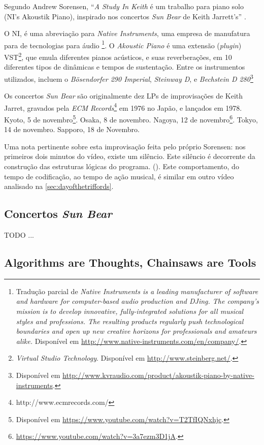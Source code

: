 Segundo Andrew Sorensen, ``\emph{A Study In Keith} é um trabalho para piano solo (NI's Akoustik Piano), inspirado nos concertos \emph{Sun Bear} de Keith Jarrett's'' \cite{sorensen_keith_2009}.

O NI, é uma abreviação para \emph{Native Instruments}, uma empresa de manufatura para  de tecnologias para áudio \footnote{Tradução parcial  de \emph{Native Instruments is a leading manufacturer of software and hardware for computer-based audio production and DJing. The company's mission is to develop innovative, fully-integrated solutions for all musical styles and professions. The resulting products regularly push technological boundaries and open up new creative horizons for professionals and amateurs alike.} Disponível em \url{http://www.native-instruments.com/en/company/}.}. O \emph{Akoustic Piano} é uma extensão (\emph{plugin}) VST\footnote{\emph{Virtual Studio Technology}. Disponível em \url{http://www.steinberg.net/}.}, que emula diferentes pianos acústicos, e suas reverberações, em 10 diferentes tipos de dinâmicas e tempos de sustentação. Entre os instrumentos utilizados, incluem o \emph{Bösendorfer 290 Imperial}, \emph{Steinway D}, e \emph{Bechstein D 280}\footnote{Disponível em \url{http://www.kvraudio.com/product/akoustik-piano-by-native-instruments}.}

Os concertos \emph{Sun Bear} são originalmente dez LPs  de improvisações de Keith Jarret, gravados pela \emph{ECM Records}\footnote{http://www.ecmrecords.com/} em 1976 no Japão, e lançados em 1978. Kyoto, 5 de novembro\footnote{Disponível em \url{https://www.youtube.com/watch?v=T2TfIQNxhjc}.}. Osaka, 8 de novembro. Nagoya, 12 de novembro\footnote{\url{https://www.youtube.com/watch?v=3a7ezm3D1jA}.}. Tokyo, 14 de novembro. Sapporo, 18 de Novembro.

Uma nota pertinente sobre esta improvisação feita pelo próprio Sorensen: nos primeiros dois minutos do vídeo, existe um silêncio. Este silêncio é decorrente da construção das estruturas lógicas do programa. (). Este comportamento, do tempo de codificação, ao tempo de ação musical, é similar em outro vídeo analisado na  \autoref{sec:dayofthetriffords}. 

\subsection{Concertos \emph{Sun Bear}}\label{sec:sunbear}

TODO ...

\subsection{Algorithms are Thoughts, Chainsaws are Tools}

